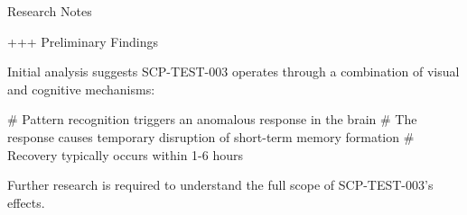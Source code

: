 
Research Notes

\begin{scpquote}
+++ Preliminary Findings

Initial analysis suggests SCP-TEST-003 operates through a combination of visual and cognitive mechanisms:

\# Pattern recognition triggers an anomalous response in the brain
\# The response causes temporary disruption of short-term memory formation
\# Recovery typically occurs within 1-6 hours

Further research is required to understand the full scope of SCP-TEST-003's effects.
\end{scpquote}

